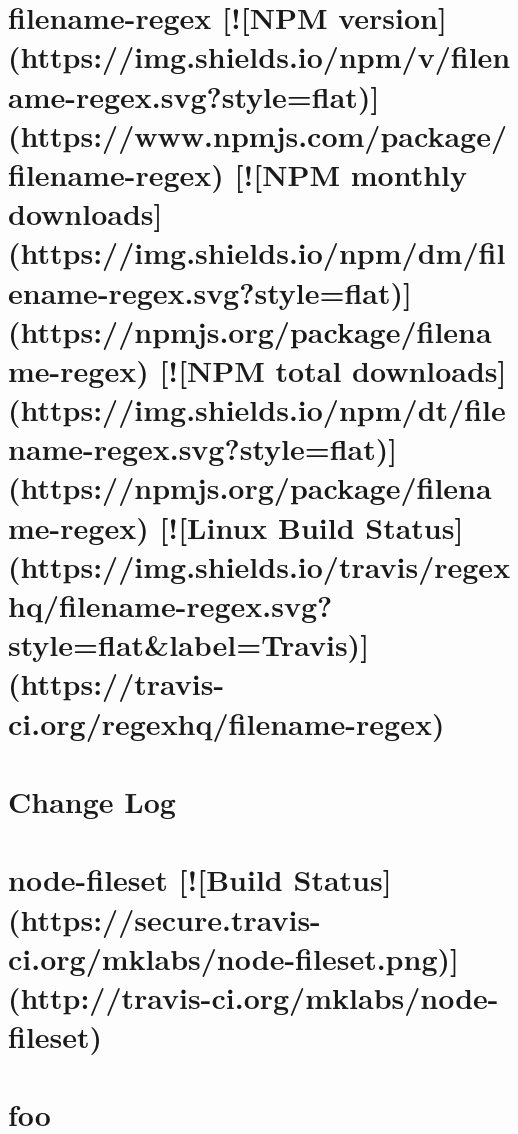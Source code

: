\documentclass[twoside]{book}
\newcommand{\+}{\discretionary{\mbox{\scriptsize$\hookleftarrow$}}{}{}}
\begin{document}
\chapter{filename-\/regex \mbox{[}!\mbox{[}N\+PM version\mbox{]}(https\+://img.shields.\+io/npm/v/filename-\/regex.svg?style=flat)\mbox{]}(https\+://www.npmjs.\+com/package/filename-\/regex) \mbox{[}!\mbox{[}N\+PM monthly downloads\mbox{]}(https\+://img.shields.\+io/npm/dm/filename-\/regex.svg?style=flat)\mbox{]}(https\+://npmjs.org/package/filename-\/regex) \mbox{[}!\mbox{[}N\+PM total downloads\mbox{]}(https\+://img.shields.\+io/npm/dt/filename-\/regex.svg?style=flat)\mbox{]}(https\+://npmjs.org/package/filename-\/regex) \mbox{[}!\mbox{[}Linux Build Status\mbox{]}(https\+://img.shields.\+io/travis/regexhq/filename-\/regex.svg?style=flat\&label=Travis)\mbox{]}(https\+://travis-\/ci.org/regexhq/filename-\/regex)}
\label{md__c_1_workspace_demo_src_main_script_node_modules_filename-regex__r_e_a_d_m_e}

\chapter{Change Log}
\label{md__c_1_workspace_demo_src_main_script_node_modules_fileset__c_h_a_n_g_e_l_o_g}

\chapter{node-\/fileset \mbox{[}!\mbox{[}Build Status\mbox{]}(https\+://secure.travis-\/ci.org/mklabs/node-\/fileset.png)\mbox{]}(http\+://travis-\/ci.org/mklabs/node-\/fileset)}
\label{md__c_1_workspace_demo_src_main_script_node_modules_fileset__r_e_a_d_m_e}

\chapter{foo}
\label{md__c_1_workspace_demo_src_main_script_node_modules_fileset_test_fixtures_foo}

\end{document}
